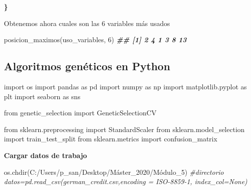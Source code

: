 \documentclass[
  a4paper,
  DIV=11,
  numbers=noendperiod]{scrreprt}
\newenvironment{Shaded}{\begin{snugshade}}{\end{snugshade}}
\newcommand{\CommentTok}[1]{\textcolor[rgb]{0.56,0.35,0.01}{\textit{#1}}}
\newcommand{\DecValTok}[1]{\textcolor[rgb]{0.00,0.00,0.81}{#1}}
\newcommand{\DocumentationTok}[1]{\textcolor[rgb]{0.56,0.35,0.01}{\textbf{\textit{#1}}}}
\newcommand{\ErrorTok}[1]{\textcolor[rgb]{0.64,0.00,0.00}{\textbf{#1}}}
\newcommand{\FunctionTok}[1]{\textcolor[rgb]{0.00,0.00,0.00}{#1}}
\newcommand{\ImportTok}[1]{\textcolor[rgb]{0.00,0.00,0.00}{#1}}
\newcommand{\NormalTok}[1]{\textcolor[rgb]{0.00,0.00,0.00}{#1}}
\newcommand{\StringTok}[1]{\textcolor[rgb]{0.31,0.60,0.02}{#1}}
\begin{document}
\begin{Shaded}
\begin{Highlighting}[numbers=left,,]
\ErrorTok{\}}
\end{Highlighting}
\end{Shaded}

\begin{Shaded}
\begin{Highlighting}[numbers=left,,]
\NormalTok{Obtenemos ahora cuales son las }\DecValTok{6}\NormalTok{ variables más usados}
\end{Highlighting}
\end{Shaded}

\begin{Shaded}
\begin{Highlighting}[numbers=left,,]
\FunctionTok{posicion\_maximos}\NormalTok{(uso\_variables, }\DecValTok{6}\NormalTok{) }\DocumentationTok{\#\# [1] 2 4 1 3 8 13 }
\end{Highlighting}
\end{Shaded}

\hypertarget{algoritmos-genuxe9ticos-en-python}{%
\subsection{Algoritmos genéticos en
Python}\label{algoritmos-genuxe9ticos-en-python}}

\begin{Shaded}
\begin{Highlighting}[numbers=left,,]
\ImportTok{import}\NormalTok{ os }\ImportTok{import}\NormalTok{ pandas }\ImportTok{as}\NormalTok{ pd }\ImportTok{import}\NormalTok{ numpy }\ImportTok{as}\NormalTok{ np }\ImportTok{import}\NormalTok{ matplotlib.pyplot }\ImportTok{as}\NormalTok{ plt }\ImportTok{import}\NormalTok{ seaborn }\ImportTok{as}\NormalTok{ sns}

\ImportTok{from}\NormalTok{ genetic\_selection }\ImportTok{import}\NormalTok{ GeneticSelectionCV}

\ImportTok{from}\NormalTok{ sklearn.preprocessing }\ImportTok{import}\NormalTok{ StandardScaler }\ImportTok{from}\NormalTok{ sklearn.model\_selection }\ImportTok{import}\NormalTok{ train\_test\_split }\ImportTok{from}\NormalTok{ sklearn.metrics }\ImportTok{import}\NormalTok{ confusion\_matrix}
\end{Highlighting}
\end{Shaded}

\textbf{Cargar datos de trabajo}

\begin{Shaded}
\begin{Highlighting}[numbers=left,,]

\NormalTok{os.chdir(}\StringTok{\textquotesingle{}C:/Users/p\_san/Desktop/Máster\_2020/Módulo\_5\textquotesingle{}}\NormalTok{) }\CommentTok{\#directorio datos=pd.read\_csv(\textquotesingle{}german\_credit.csv\textquotesingle{},encoding = \textquotesingle{}ISO{-}8859{-}1\textquotesingle{}, index\_col=None)}
\end{Highlighting}
\end{Shaded}
\end{document}
